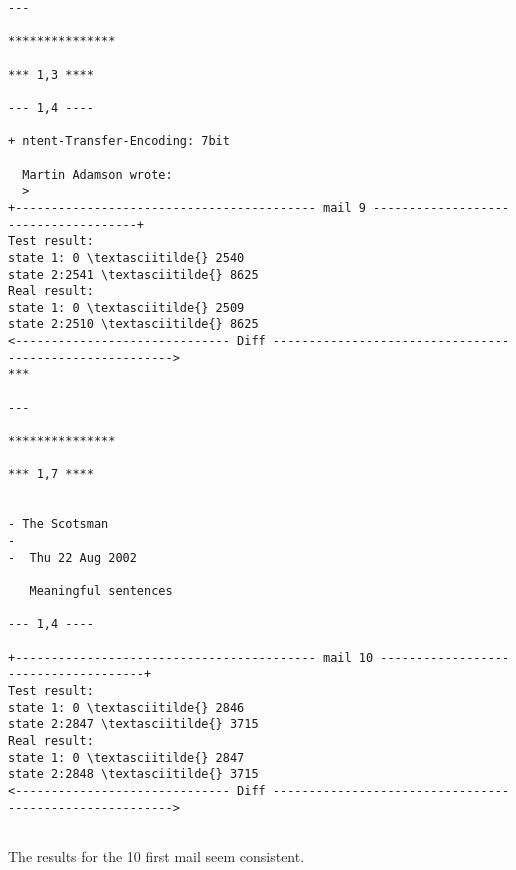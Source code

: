 \documentclass[11pt]{article}
\begin{document}
\begin{Verbatim}[commandchars=\\\{\}]
--- 

***************

*** 1,3 ****

--- 1,4 ----

+ ntent-Transfer-Encoding: 7bit
  
  Martin Adamson wrote:
  > 
+------------------------------------------ mail 9 -------------------------------------+
Test result:
state 1: 0 \textasciitilde{} 2540
state 2:2541 \textasciitilde{} 8625
Real result:
state 1: 0 \textasciitilde{} 2509
state 2:2510 \textasciitilde{} 8625
<------------------------------ Diff -------------------------------------------------------->
*** 

--- 

***************

*** 1,7 ****

  
- The Scotsman
- 
-  Thu 22 Aug 2002 
  
   Meaningful sentences 
   
--- 1,4 ----

+------------------------------------------ mail 10 -------------------------------------+
Test result:
state 1: 0 \textasciitilde{} 2846
state 2:2847 \textasciitilde{} 3715
Real result:
state 1: 0 \textasciitilde{} 2847
state 2:2848 \textasciitilde{} 3715
<------------------------------ Diff -------------------------------------------------------->


    \end{Verbatim}

    The results for the 10 first mail seem consistent.
\end{document}
